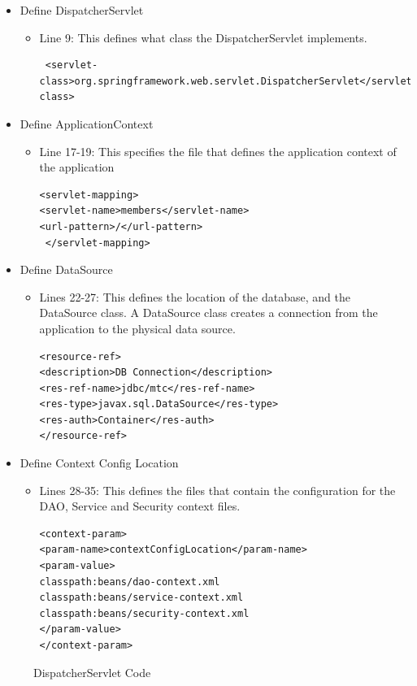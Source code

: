 \begin{itemize}
\item Define DispatcherServlet
\begin{itemize}
\item Line 9: This defines what class the DispatcherServlet implements.
\begin{lstlisting}
 <servlet-class>org.springframework.web.servlet.DispatcherServlet</servlet-class>
\end{lstlisting}
\end{itemize}
\item Define ApplicationContext
\begin{itemize}
\item Line 17-19: This specifies the file that defines the application context of the application
\begin{lstlisting}
<servlet-mapping>
<servlet-name>members</servlet-name>
<url-pattern>/</url-pattern>
 </servlet-mapping>
\end{lstlisting}
\end{itemize}
\item Define DataSource
\begin{itemize}
\item Lines 22-27: This defines the location of the database, and the DataSource class. A DataSource class creates a connection from the application to the physical data source.
\begin{lstlisting}
<resource-ref>
<description>DB Connection</description>
<res-ref-name>jdbc/mtc</res-ref-name>
<res-type>javax.sql.DataSource</res-type>
<res-auth>Container</res-auth>
</resource-ref>
\end{lstlisting}
\end{itemize}
\item Define Context Config Location
\begin{itemize}
\item Lines 28-35: This defines the files that contain the configuration for the DAO, Service and Security context files.
\begin{lstlisting}
<context-param>
<param-name>contextConfigLocation</param-name>
<param-value>
classpath:beans/dao-context.xml
classpath:beans/service-context.xml
classpath:beans/security-context.xml
</param-value>
</context-param>
\end{lstlisting}
\end{itemize}
\end{itemize}
\begin{figure}[H]
\caption{DispatcherServlet Code}
\label{fig:webxmlExplain}
\end{figure}

